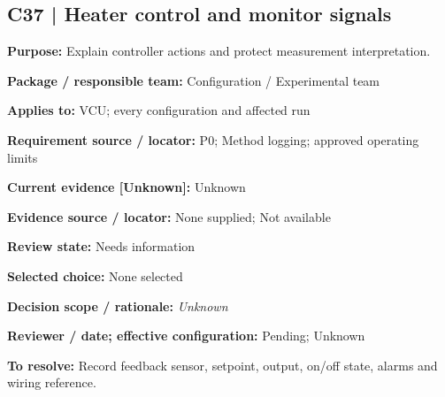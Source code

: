 \documentclass[11pt]{article}
\begin{document}
\par\noindent\begin{minipage}{\textwidth}\small\setlength{\parskip}{2pt}
\subsection*{C37 | Heater control and monitor signals}
\textbf{Purpose:} Explain controller actions and protect measurement interpretation.\par
\textbf{Package / responsible team:} Configuration / Experimental team\par
\textbf{Applies to:} VCU; every configuration and affected run\par
\textbf{Requirement source / locator:} P0; Method logging; approved operating limits\par
\textbf{Current evidence [Unknown]:} Unknown\par
\textbf{Evidence source / locator:} None supplied; Not available\par
\textbf{Review state:} Needs information\par
\textbf{Selected choice:} None selected\par
\textbf{Decision scope / rationale:} \textit{Unknown}\par
\textbf{Reviewer / date; effective configuration:} Pending; Unknown\par
\textbf{To resolve:} Record feedback sensor, setpoint, output, on/off state, alarms and wiring reference.\par
\end{minipage}\par\vspace{5pt}
\end{document}
